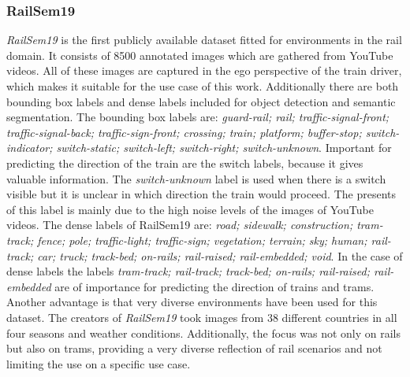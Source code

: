 
\subsubsection{RailSem19}
\textit{RailSem19} \cite{railsem19dataset} is the first publicly available dataset fitted for environments in the rail domain. It consists of 8500 annotated images which are gathered from YouTube videos. All of these images are captured in the ego perspective of the train driver, which makes it suitable for the use case of this work. Additionally there are both bounding box labels and dense labels included for object detection and semantic segmentation. The bounding box labels are: \textit{guard-rail; rail; traffic-signal-front; traffic-signal-back; traffic-sign-front; crossing; train; platform; buffer-stop; switch-indicator; switch-static; switch-left; switch-right; switch-unknown}. Important for predicting the direction of the train are the switch labels, because  it gives valuable information. The \textit{switch-unknown} label is used when there is a switch visible but it is unclear in which direction the train would proceed. The presents of this label is mainly due to the high noise levels of the images of YouTube videos.
The dense labels of RailSem19 are: \textit{road; sidewalk; construction; tram-track; fence; pole; traffic-light; traffic-sign; vegetation; terrain; sky; human; rail-track; car; truck; track-bed; on-rails; rail-raised; rail-embedded; void}. In the case of dense labels the labels \textit{tram-track; rail-track; track-bed; on-rails; rail-raised; rail-embedded} are of importance for predicting the direction of trains and trams.
Another advantage is that very diverse environments have been used for this dataset. The creators of \textit{RailSem19} took images from 38 different countries in all four seasons and weather conditions. Additionally, the focus was not only on rails but also on trams, providing a very diverse reflection of rail scenarios and not limiting the use on a specific use case.


